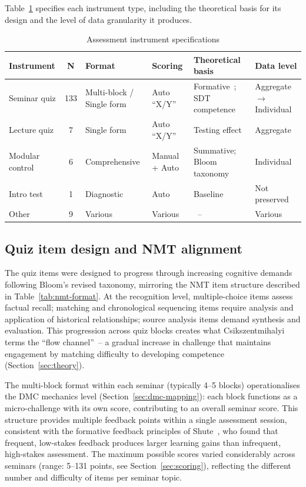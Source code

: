 Table~\ref{tab:instrument-specs} specifies each instrument type, including the theoretical basis for its design and the level of data granularity it produces.

\begin{table}[!h]
\centering
\caption{Assessment instrument specifications}
\label{tab:instrument-specs}
\footnotesize
\begin{tabularx}{\textwidth}{X c X X X X}
\hline
\textbf{Instrument} & \textbf{N} & \textbf{Format} & \textbf{Scoring} & \textbf{Theoretical basis} & \textbf{Data level} \\
\hline
Seminar quiz & 133 & Multi-block / Single form & Auto ``X/Y'' & Formative~\cite{BlackWiliam1998}; SDT competence & Aggregate $\to$ Individual \\
Lecture quiz & 7 & Single form & Auto ``X/Y'' & Testing effect~\cite{RoedigerButler2011} & Aggregate \\
Modular control & 6 & Compre\-hensive & Manual + Auto & Summative; Bloom taxonomy & Individual \\
Intro test & 1 & Diagnostic & Auto & Baseline~\cite{Hattie2009} & Not preserved \\
Other & 9 & Various & Various &~-- & Various \\
\hline
\end{tabularx}
\end{table}

\subsection{Quiz item design and NMT alignment} \label{sec:quiz-alignment}

The quiz items were designed to progress through increasing cognitive demands following Bloom's revised taxonomy, mirroring the NMT item structure described in Table~\ref{tab:nmt-format}. At the recognition level, multiple-choice items assess factual recall; matching and chronological sequencing items require analysis and application of historical relationships; source analysis items demand synthesis and evaluation. This progression across quiz blocks creates what Csikszentmihalyi~\cite{Csikszentmihalyi1990} terms the ``flow channel''~-- a gradual increase in challenge that maintains engagement by matching difficulty to developing competence (Section~\ref{sec:theory}).

The multi-block format within each seminar (typically 4--5 blocks) operationalises the DMC mechanics level (Section~\ref{sec:dmc-mapping}): each block functions as a micro-challenge with its own score, contributing to an overall seminar score. This structure provides multiple feedback points within a single assessment session, consistent with the formative feedback principles of Shute~\cite{ShuteFormative2008}, who found that frequent, low-stakes feedback produces larger learning gains than infrequent, high-stakes assessment. The maximum possible scores varied considerably across seminars (range: 5--131 points, see Section~\ref{sec:scoring}), reflecting the different number and difficulty of items per seminar topic.


